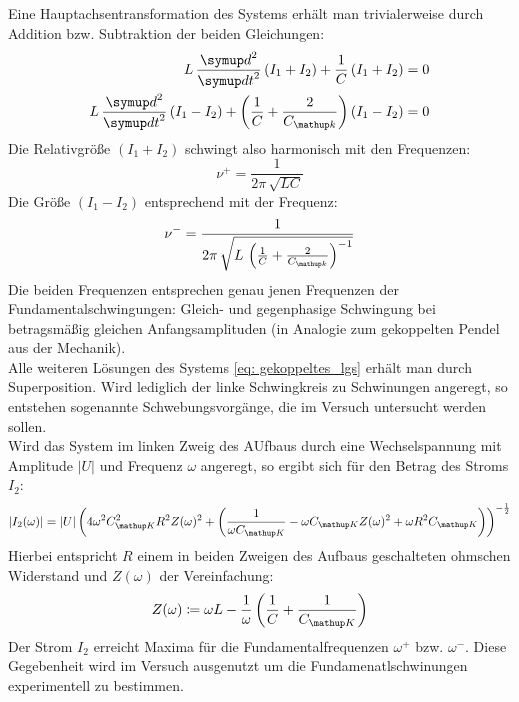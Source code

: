 Eine Hauptachsentransformation des Systems erhält man trivialerweise durch Addition bzw.
Subtraktion der beiden Gleichungen:
\begin{align}
\begin{aligned}
  L\,\frac{\dif{}^2}{\dif{t}^2} \left( I_1 + I_2 \right) + \frac{1}{C} \left( I_1 + I_2 \right) &= 0 \\
  L\,\frac{\dif{}^2}{\dif{t}^2} \left( I_1 - I_2 \right) + \left(\frac{1}{C} + \frac{2}{C\ua{k}}\right) \left( I_1 - I_2 \right) &= 0 \\
  \label{eq: gekoppeltes_lgs}
\end{aligned}
\end{align}
Die Relativgröße $\left( I_1 + I_2 \right)$ schwingt also harmonisch mit den Frequenzen:
\begin{equation}
  \nu^+ = \frac{1}{2\pi \, \sqrt{LC}}
\end{equation}
Die Größe $\left( I_1 - I_2 \right)$ entsprechend mit der Frequenz:
\begin{equation}
\nu^- = \frac{1}{2\pi \, \sqrt{L\, \left(\frac{1}{C} + \frac{2}{C\ua{k}}\right)^{-1}}}
\end{equation}
Die beiden Frequenzen entsprechen genau jenen Frequenzen der Fundamentalschwingungen: Gleich- und gegenphasige Schwingung bei
betragsmäßig gleichen Anfangsamplituden (in Analogie zum gekoppelten Pendel aus der Mechanik). \\
Alle weiteren Lösungen des Systems \eqref{eq: gekoppeltes_lgs} erhält man durch Superposition. Wird lediglich der linke Schwingkreis zu Schwinungen
angeregt, so entstehen sogenannte Schwebungsvorgänge, die im Versuch untersucht werden sollen.\\
Wird das System im linken Zweig des AUfbaus durch eine Wechselspannung mit Amplitude $\left| U \right|$ und Frequenz $\omega$ angeregt, so ergibt sich für den Betrag des
Stroms $I_2$:
\begin{equation}
|I_2(\omega)| = |U| \left( 4 \omega^2 C\ua{K}^2 R^2 Z(\omega )^2 + \left(\frac{1}{\omega C\ua{K}} - \omega C\ua{K} Z(\omega )^2 + \omega R^2 C\ua{K}\right)\right)^{-\frac{1}{2}}
\end{equation}
Hierbei entspricht $R$ einem in beiden Zweigen des Aufbaus geschalteten ohmschen Widerstand und $Z(\omega)$ der Vereinfachung:
\begin{equation}
  Z(\omega ) \coloneqq \omega L - \frac{1}{\omega } \left(\frac{1}{C} + \frac{1}{C\ua{K}}\right)
\end{equation}
Der Strom $I_2$ erreicht Maxima für die Fundamentalfrequenzen $\omega^+$ bzw. $\omega^-$. Diese Gegebenheit wird im Versuch ausgenutzt um
die Fundamenatlschwinungen experimentell zu bestimmen.
